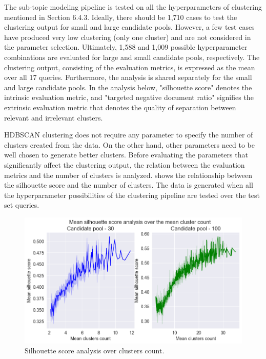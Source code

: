 The sub-topic modeling pipeline is tested on all the hyperparameters of clustering mentioned in Section 6.4.3. Ideally, there should be 1,710 cases to test the clustering output for small and large candidate pools. However, a few test cases have produced very low clustering (only one cluster) and are not considered in the parameter selection. Ultimately, 1,588 and 1,009 possible hyperparameter combinations are evaluated for large and small candidate pools, respectively. The clustering output, consisting of the evaluation metrics, is expressed as the mean over all 17 queries. Furthermore, the analysis is shared separately for the small and large candidate pools. In the analysis below, "silhouette score" denotes the intrinsic evaluation metric, and "targeted negative document ratio" signifies the extrinsic evaluation metric that denotes the quality of separation between relevant and irrelevant clusters.

\ac{HDBSCAN} clustering does not require any parameter to specify the number of clusters created from the data. On the other hand, other parameters need to be well chosen to generate better clusters. Before evaluating the parameters that significantly affect the clustering output, the relation between the evaluation metrics and the number of clusters is analyzed.   shows the relationship between the silhouette score and the number of clusters. The data is generated when all the hyperparameter possibilities of the clustering pipeline are tested over the test set queries.

\begin{figure}[h]
	\centering
	\includegraphics[width=.99\textwidth]{images/subplots/sil_score_ccnt_subplot.png}
	\caption{Silhouette score analysis over clusters count. \label{fig:silhouette_score_vs_cc}}
\end{figure}

